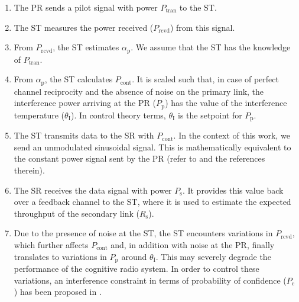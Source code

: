 \begin{enumerate}
	\item The PR sends a pilot signal with power $P_\textrm{tran}$ to the ST.
	\item The ST measures the power received ($P_\textrm{rcvd}$) from this signal.
	\item From $P_\textrm{rcvd}$, the ST estimates $\alpha_\textrm{p}$. We assume that the ST has the knowledge of  $P_\textrm{tran}$. 
	\item From $\alpha_\textrm{p}$, the ST calculates $P_\textrm{cont}$. It is scaled such that, in case of perfect channel reciprocity and the absence of noise on the primary link, the interference power arriving at the PR ($P_\textrm{p}$) has the value of the interference temperature ($\theta_\textrm{I}$). In control theory terms, $\theta_\textrm{I}$ is the setpoint for $P_\textrm{p}$.
	\item The ST transmits data to the SR with $P_\textrm{cont}$. In the context of this work, we send an unmodulated sinusoidal signal. This is mathematically equivalent to the constant power signal sent by the PR (refer to \cite{Kaushik15} and the references therein).
	\item The SR receives the data signal with power $P_\textrm{s}$. It provides this value back over a feedback channel to the ST, where it is used to estimate the expected throughput of the secondary link ($R_\textrm{s}$).
	\item Due to the presence of noise at the ST, the ST encounters variations in $P_\textrm{rcvd}$, which further affects $P_\textrm{cont}$ and, in addition with noise at the PR, finally translates to variations in $P_\textrm{p}$ around $\theta_\textrm{I}$. This may severely degrade the performance of the cognitive radio system. In order to control these variations, an interference constraint in terms of probability of confidence ($P_\textrm{c}$) has been proposed in \cite{Kaushik15}.
\end{enumerate}


